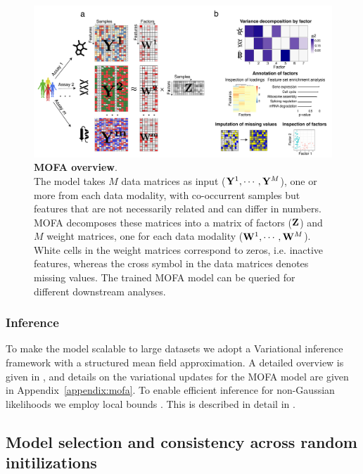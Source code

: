 \begin{figure}[H]
	\begin{center}
		\includegraphics[width=1.0\textwidth]{MOFA}
		\caption{\textbf{MOFA overview}.\\
		The model takes $M$ data matrices as input (${\bf Y}^1, \cdots, {\bf Y}^M$), one or more from each data modality, with co-occurrent samples but features that are not necessarily related and can differ in numbers. MOFA decomposes these matrices into a matrix of factors (${\bf Z}$) and $M$ weight matrices, one for each data modality (${\bf W}^1, \cdots, {\bf W}^M$). White cells in the weight matrices correspond to zeros, i.e. inactive features, whereas the cross symbol in the data matrices denotes missing values. The trained MOFA model can be queried for different downstream analyses.}
		\label{fig:MOFA}
	\end{center}
\end{figure}


\subsubsection{Inference}

To make the model scalable to large datasets we adopt a Variational inference framework with a structured mean field approximation. A detailed overview is given in , and details on the variational updates for the MOFA model are given in Appendix~\ref{appendix:mofa}. To enable efficient inference for non-Gaussian likelihoods we employ local bounds \cite{Jaakkola2000,Seeger2012}. This is described in detail in .


\subsection{Model selection and consistency across random initilizations} \label{section:mofa_robustness}

